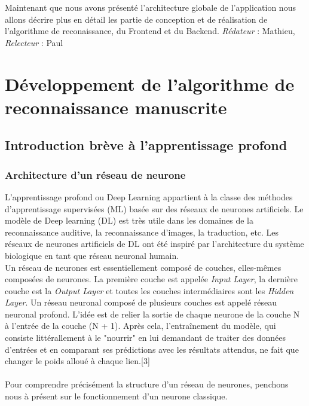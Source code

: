 \documentclass[oneside,a4paper,13pt]{article}
\begin{document}
\bigbreak
Maintenant que nous avons présenté l'architecture globale de l'application nous allons décrire plus en détail les partie de conception et de réalisation de l'algorithme de reconaissance, du Frontend et du Backend. 
\smallbreak\textit{Rédateur} : Mathieu, \textit{Relecteur} : Paul




\section{Développement de l'algorithme de reconnaissance manuscrite}

\subsection{Introduction brève à l'apprentissage profond}
\subsubsection{Architecture d'un réseau de neurone}
L'apprentissage profond ou Deep Learning appartient à la classe des méthodes d'apprentissage supervisées (ML) basée sur des réseaux de neurones artificiels. Le modèle de Deep learning (DL) est très utile dans les domaines de la reconnaissance auditive, la reconnaissance d'images, la traduction, etc. Les réseaux de neurones artificiels de DL ont été inspiré par l'architecture du système biologique en tant que réseau neuronal humain. \\
Un réseau de neurones est essentiellement composé de couches, elles-mêmes composées de neurones. La première couche est appelée \emph {Input Layer}, la dernière couche est la \emph {Output Layer} et toutes les couches intermédiaires sont les \emph {Hidden Layer}. Un réseau neuronal composé de plusieurs couches est appelé réseau neuronal profond. L'idée est de relier la sortie de chaque neurone de la couche N à l'entrée de la couche (N + 1). Après cela, l'entraînement du modèle, qui consiste littérallement à le "nourrir" en lui demandant de traiter des données d'entrées et en comparant ses prédictions avec les résultats attendus, ne fait que changer le poids alloué à chaque lien.[3]\\ \\
Pour comprendre précisément la structure d'un réseau de neurones, penchons nous à présent sur le fonctionnement d'un neurone classique.
\end{document}
